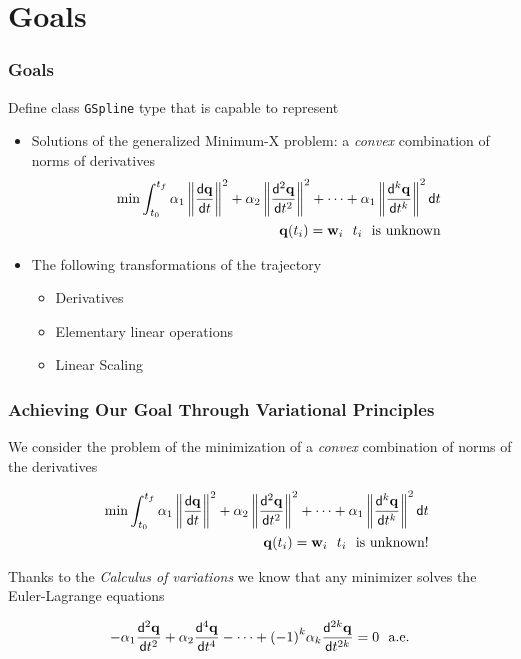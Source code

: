 \section{Goals}

\begin{frame}[t]
	\frametitle{Goals}

	\vfill
	{\fontsize{10}{6}
		Define class \texttt{GSpline} type that is capable to represent
		\begin{itemize}
			\item Solutions of the generalized  Minimum-X problem: a \emph{convex} combination of norms of derivatives
			      \begin{eqnarray*}
				      &&\min \int_{t_0}^{t_f} \alpha_1 \left\|\frac{\mathsf{d} \mathbf{q}}{\mathsf{d} t}\right\|^2 + \alpha_2 \left\|\frac{\mathsf{d}^{2} \mathbf{q}}{\mathsf{d} t^{2}}\right\|^2 + \cdots  + \alpha_1 \left\|\frac{\mathsf{d}^{k} \mathbf{q}}{\mathsf{d} t^{k}} \right\|^2 \mathsf{d} t \\
				      &&\mathbf{q}(t_i) = \mathbf{w}_i \ \ t_i\ \text{ is unknown}
			      \end{eqnarray*}
			\item The following transformations of the trajectory
			      \begin{itemize}
				      \item Derivatives
				      \item Elementary linear operations
				      \item Linear Scaling
			      \end{itemize}
		\end{itemize}
	}
	\vfill
\end{frame}
\begin{frame}[t]
	\frametitle{Achieving Our Goal Through Variational Principles}

	We consider the problem of the minimization of a \emph{convex} combination of norms of the derivatives

	\begin{eqnarray*}
		&&\min \int_{t_0}^{t_f} \alpha_1 \left\|\frac{\mathsf{d} \mathbf{q}}{\mathsf{d} t}\right\|^2 + \alpha_2 \left\|\frac{\mathsf{d}^{2} \mathbf{q}}{\mathsf{d} t^{2}}\right\|^2 + \cdots  + \alpha_1 \left\|\frac{\mathsf{d}^{k} \mathbf{q}}{\mathsf{d} t^{k}} \right\|^2 \mathsf{d} t \\
		&&\mathbf{q}(t_i) = \mathbf{w}_i \ \ t_i\ \text{ is unknown!}
	\end{eqnarray*}

	Thanks to the \emph{Calculus of variations} we know that any minimizer solves the Euler-Lagrange equations

	\begin{equation*}
		-\alpha_1 \diffk{\qv}{t}{2}+ \alpha_2 \diffk{\qv}{t}{4}- \cdots +  {(-1)}^k \alpha_k \diffk{\qv}{t}{2k}= 0 \ \ \text{a.e.}
	\end{equation*}

\end{frame}

